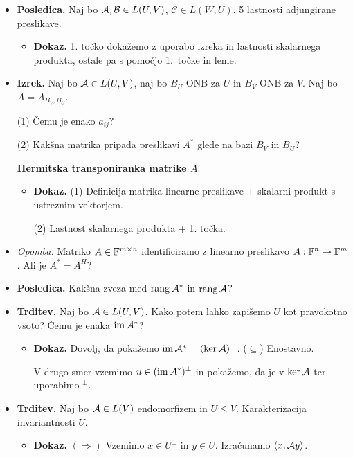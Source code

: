 \begin{enumerate}
\begin{itemize}
        \item \colorbox{orange!30}{\textbf{Posledica.}} Naj bo $\mathcal{A}, \mathcal{B} \in L(U, V)$, $\mathcal{C} \in L(W, U)$. 5 lastnosti adjungirane preslikave.
        \begin{itemize}
            \item \colorbox{green!30}{\textbf{Dokaz.}} 1. točko dokažemo z uporabo izreka in lastnosti skalarnega produkta, ostale pa s pomočjo 1.~točke in leme.        
        \end{itemize}
        \item \colorbox{blue!30}{\textbf{Izrek.}} Naj bo $\mathcal{A} \in L(U, V)$, naj bo $B_U$ ONB za $U$ in $B_V$ ONB za $V$. Naj bo $A = A_{B_V, B_U}$.
        
        (1) Čemu je enako $a_{ij}$?

        (2) Kakšna matrika pripada preslikavi $A^*$ glede na bazi $B_V$ in $B_U$?

        \textbf{Hermitska transponiranka matrike $A$}.
        \begin{itemize}
            \item \colorbox{green!30}{\textbf{Dokaz.}} (1) Definicija matrika linearne preslikave + skalarni produkt s ustreznim vektorjem.
            
            (2) Lastnost skalarnega produkta + 1. točka.
        \end{itemize}
        \item \colorbox{yellow!30}{\emph{Opomba.}} Matriko $A \in \mathbb{F}^{m \times n}$ identificiramo z linearno preslikavo $A: \mathbb{F}^n \to \mathbb{F}^m$. Ali je $A^* = A^H$?
        \item \colorbox{orange!30}{\textbf{Posledica.}} Kakšna zveza med $\operatorname{rang} \mathcal{A}^*$ in $\operatorname{rang} \mathcal{A}$?
        \item \colorbox{blue!30}{\textbf{Trditev.}} Naj bo $\mathcal{A} \in L(U, V)$. Kako potem lahko zapišemo $U$ kot pravokotno vsoto? Čemu je enaka $\operatorname{im} \mathcal{A}^*$?
        \begin{itemize}
            \item \colorbox{green!30}{\textbf{Dokaz.}} Dovolj, da pokažemo $\operatorname{im} \mathcal{A}^* = (\ker \mathcal{A})^\perp$. ($\subseteq$) Enostavno. 
            
            V drugo smer vzemimo $u \in (\operatorname{im} \mathcal{A}^*)^\perp$ in pokažemo, da je v $\ker \mathcal{A}$ ter uporabimo $^\perp$.
        \end{itemize}
        \item \colorbox{blue!30}{\textbf{Trditev.}} Naj bo $\mathcal{A} \in L(V)$ endomorfizem in $U \leq V$. Karakterizacija invariantnosti $U$.
        \begin{itemize}
            \item \colorbox{green!30}{\textbf{Dokaz.}} $(\Rightarrow)$ Vzemimo $x \in U^\perp$ in $y \in U$. Izračunamo $\left\langle x, \mathcal{A} y \right\rangle$.
            

\end{itemize}
\end{itemize}
\end{enumerate}
